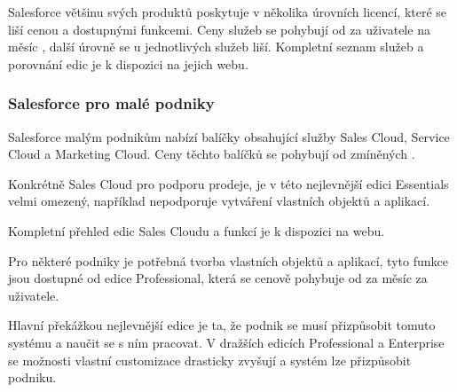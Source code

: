 Salesforce většinu svých produktů poskytuje v několika úrovních licencí, které se liší cenou a dostupnými funkcemi. Ceny služeb se pohybují od  za uživatele na měsíc \cite{SalesforcePricing}, další úrovně se u jednotlivých služeb liší. Kompletní seznam služeb a porovnání edic je k dispozici na jejich webu.
\subsubsection{Salesforce pro malé podniky}
Salesforce malým podnikům nabízí balíčky obsahující služby Sales Cloud, Service Cloud a Marketing Cloud. Ceny těchto balíčků se pohybují od zmíněných . 

Konkrétně Sales Cloud pro podporu prodeje, je v této nejlevnější edici Essentials velmi omezený, například nepodporuje vytváření vlastních objektů a aplikací. 

Kompletní přehled edic Sales Cloudu a funkcí je k dispozici na webu. \cite{SalesforcePricingSalesCloud}

Pro některé podniky je potřebná tvorba vlastních objektů a aplikací, tyto funkce jsou dostupné od edice Professional, která se cenově pohybuje od  za měsíc za uživatele. \cite{SalesforceCustomObjectLimit}

Hlavní překážkou nejlevnější edice je ta, že podnik se musí přizpůsobit tomuto systému a naučit se s ním pracovat. V dražších edicích Professional a Enterprise se možnosti vlastní customizace drasticky zvyšují a systém lze přizpůsobit podniku.
